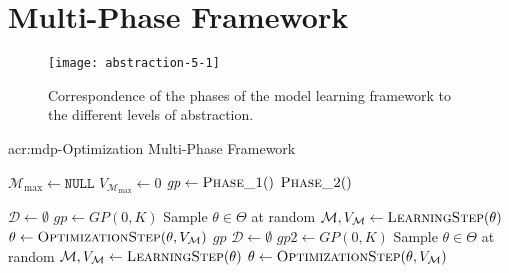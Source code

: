 

\section{Multi-Phase Framework}
\label{sec:cost-effective-optimization}

\begin{figure}[t]
	\centering
	\texttt{[image: abstraction-5-1]}
	\caption{Correspondence of the phases of the model learning framework to the different levels of abstraction.}
	\label{fig:abstraction-cost}
\end{figure}

\begin{algorithm}[t!]
	\caption{\acrshort{acr:mdp}-Optimization Multi-Phase Framework}
	\label{alg:multi-phase-framework}
	\begin{algorithmic}[1]
		
		\State $\mathcal{M}_\text{max} \gets \texttt{NULL}$
		\State $V_{\mathcal{M}_\text{max}} \gets 0$
		\State $\mathit{gp} \gets \textproc{Phase\_1}()$
		\State $\textproc{Phase\_2}()$
		
		\Statex
			\State $\mathcal{D} \gets \emptyset$
			\State $\mathit{gp} \gets GP(0, K)$
			\State Sample $\theta \in \Theta$ at random
			\Repeat
				\State $\mathcal{M}, V_\mathcal{M} \gets \textproc{LearningStep}(\theta)$
				\State $\theta \gets \textproc{OptimizationStep}(\theta, V_\mathcal{M})$
			\State\Return $\mathit{gp}$
		\EndFunction
		\Statex
			\State $\mathcal{D} \gets \emptyset$
			\State $\mathit{gp2} \gets GP(0, K)$
			\State Sample $\theta \in \Theta$ at random
			\Repeat
			\State $\mathcal{M}, V_\mathcal{M} \gets \textproc{LearningStep}(\theta)$
			\State $\theta \gets \textproc{OptimizationStep}(\theta, V_\mathcal{M})$
		\EndFunction
	\end{algorithmic}
\end{algorithm}

